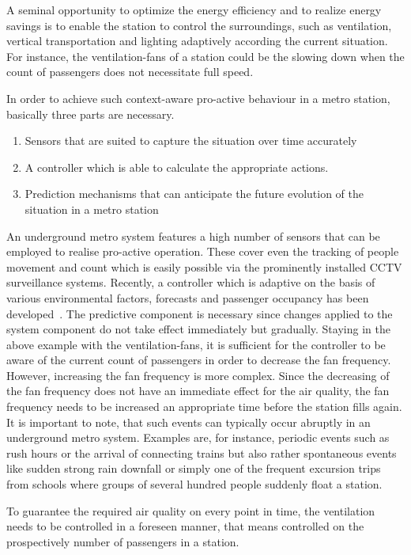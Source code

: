 A seminal opportunity to optimize the energy efficiency and to realize energy savings is to enable the station to control the surroundings, such as ventilation, vertical transportation and lighting adaptively according the current situation. 
For instance, the ventilation-fans of a station could be the slowing down when the count of passengers does not necessitate full speed.

In order to achieve such context-aware pro-active behaviour in a metro station, basically three parts are necessary. 
\begin{enumerate}
 \item Sensors that are suited to capture the situation over time accurately
 \item A controller which is able to calculate the appropriate actions.
 \item Prediction mechanisms that can anticipate the future evolution of the situation in a metro station
\end{enumerate}
An underground metro system features a high number of sensors that can be employed to realise pro-active operation.
These cover even the tracking of people movement and count which is easily possible via the prominently installed CCTV surveillance systems.
Recently, a controller which is adaptive on the basis of various environmental factors, forecasts and passenger occupancy has been developed~\cite{guo_intelligent_2013}.
The predictive component is necessary since changes applied to the system component do not take effect immediately but gradually. 
Staying in the above example with the ventilation-fans, it is sufficient for the controller to be aware of the current count of passengers in order to decrease the fan frequency. 
However, increasing the fan frequency is more complex. 
Since the decreasing of the fan frequency does not have an immediate effect for the air quality, the fan frequency needs to be increased an appropriate time before the station fills again. 
It is important to note, that such events can typically occur abruptly in an underground metro system. 
Examples are, for instance, periodic events such as rush hours or the arrival of connecting trains but also rather spontaneous events like sudden strong rain downfall or simply one of the frequent excursion trips from schools where groups of several hundred people suddenly float a station. 

To guarantee the required air quality on every point in time, the ventilation needs to be controlled in a foreseen manner, that means controlled on the prospectively number of passengers in a station.


